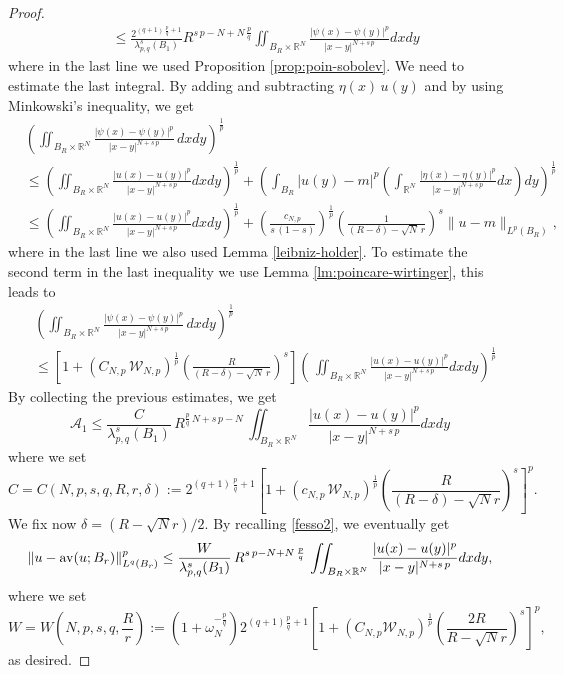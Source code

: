 \documentclass{amsart}
\theoremstyle{definition}
\numberwithin{equation}{section}
\begin{document}
\begin{proof}
\[\begin{split}
		&\le \frac{2^{(q+1)\,\frac{p}{q}+1}}{\lambda_{p,q}^s(B_1)} R^{s\,p - N + N\,\frac{p}{q}} \iint_{B_{R} \times \mathbb{R}^N} \frac{|\psi(x) - \psi(y)|^p}{|x - y|^{N+s\,p}}dxdy
	\end{split}
	\]
	where in the last line we used  Proposition \ref{prop:poin-sobolev}. We need to estimate the last integral. By adding and subtracting $\eta(x)\,u(y)$ and by using Minkowski's inequality, we get 
	\[
	\begin{split}
		&\left(\iint_{B_{R} \times \mathbb{R}^N} \frac{|\psi(x) - \psi(y)|^p}{|x-y|^{N+s\,p}} \,dxdy\right)^{\frac{1}{p}} \\
		&\le \left(\iint_{B_{R} \times \mathbb{R}^N}\frac{|u(x) - u(y)|^p}{|x-y|^{N+s\,p}}dxdy \right)^{\frac{1}{p}} + \left(\int_{B_{R}}|u(y) - m|^p\left(\int_{\mathbb{R}^N} \frac{|\eta(x) - \eta(y)|^{p}}{|x-y|^{N+s\,p}}dx\right) dy\right)^{\frac{1}{p}}\\
		&\le  \left(\iint_{B_{R} \times \mathbb{R}^N}\frac{|u(x) - u(y)|^p}{|x-y|^{N+s\,p}}dxdy \right)^{\frac{1}{p}} + \left(\frac{c_{N,p}}{s\,(1-s)}\right)^{\frac{1}{p}} \left(\frac{1}{(R - \delta)-\sqrt{N}\,r}\right)^s \|u - m\|_{L^p(B_{R})},
	\end{split}
	\]
	where in the last line we also used Lemma \ref{leibniz-holder}. To estimate the second term in the last inequality we use Lemma \ref{lm:poincare-wirtinger}, this leads to 
	\[
	\begin{split}
		&\left(\iint_{B_{R} \times \mathbb{R}^N} \frac{|\psi(x) - \psi(y)|^p}{|x-y|^{N+s\,p}} \,dxdy\right)^{\frac{1}{p}} \\
		&\le \left[1+\left(C_{N,p}\,\mathcal{W}_{N,p}\right)^{\frac{1}{p}} \left(\frac{R}{(R- \delta)-\sqrt{N}\,r}\right)^s\right] \left(\,\iint_{B_{R} \times \mathbb{R}^N} \frac{|u(x) - u(y)|^p}{|x-y|^{N+s\,p}}dxdy\right)^{\frac{1}{p}}
	\end{split}
	\] 
	By collecting the previous estimates, we get 
	\[
	\mathcal{A}_1 \le \frac{C}{\lambda_{p,q}^s(B_1)}\,R^{\frac{p}{q}\,N + s\,p - N}\,\iint_{B_{R} \times \mathbb{R}^N} \frac{|u(x) - u(y)|^p}{|x-y|^{N+s\,p}}dxdy
	\] 
	where we set 
	\[
	C = C\left(N,p,s, q, R, r, \delta\right) :=  2^{(q+1)\,\frac{p}{q} + 1} \left[1+\left(c_{N,p}\,\mathcal{W}_{N,p}\right)^{\frac{1}{p}} \left(\frac{R}{(R - \delta) - \sqrt{N}r}\right)^s\right]^p.
	\]
	We fix now %
	$
	\delta = (R - \sqrt{N}r)/2.
	$ 
	By recalling \eqref{fesso2}, we eventually get 
	\[
	\|u - {\rm av}(u; B_r)\|^p_{L^q(B_r)} \le \frac{W}{\lambda_{p,q}^s(B_1)}\,R^{s\,p - N + N\,\frac{p}{q}}\,\iint_{B_{R} \times \mathbb{R}^N} \frac{|u(x) - u(y)|^p}{|x-y|^{N+s\,p}}dxdy,
	\]
	where we set 
	\begin{equation} \label{esplicita0}
		W = W\left(N, p, s, q, \frac{R}{r}\right):=  \left(1+\omega_N^{-\frac{p}{q}}\right)  2^{(q+1)\frac{p}{q} + 1} \left[1+\left(C_{N,p}\mathcal{W}_{N,p}\right)^{\frac{1}{p}} \left(\frac{2R}{R - \sqrt{N}r}\right)^s\right]^p,
	\end{equation}
	as desired.
\end{proof}
\end{document}
